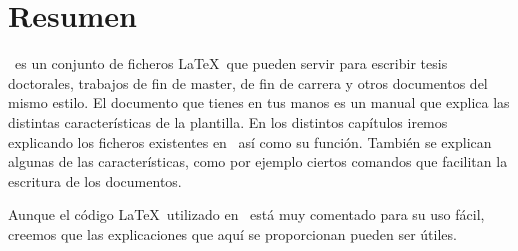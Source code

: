 \chapter{Resumen}



\texis\ es un conjunto de ficheros \LaTeX\ que pueden servir para
escribir tesis doctorales, trabajos de fin de master, de fin de
carrera y otros documentos del mismo estilo. El documento que tienes
en tus manos es un manual que explica las distintas características de
la plantilla. En los distintos capítulos iremos explicando los
ficheros existentes en \texis\ así como su función. También se
explican algunas de las características, como por ejemplo ciertos
comandos que facilitan la escritura de los documentos.

Aunque el código \LaTeX\ utilizado en \texis\ está muy comentado
para su uso fácil, creemos que las explicaciones que aquí se
proporcionan pueden ser útiles.

